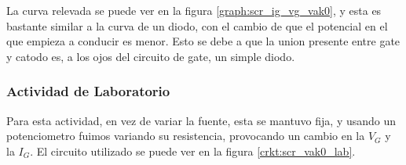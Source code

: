       La curva relevada se puede ver en la figura \ref{graph:scr_ig_vg_vak0}, y esta es bastante similar a la curva de
      un diodo, con el cambio de que el potencial en el que empieza a conducir es menor. Esto se debe a que la union
      presente entre gate y catodo es, a los ojos del circuito de gate, un simple diodo.

      \subsubsection{Actividad de Laboratorio}
        Para esta actividad, en vez de variar la fuente, esta se mantuvo fija, y usando un potenciometro fuimos variando
        su resistencia, provocando un cambio en la $V_G$ y la $I_G$. El circuito utilizado se puede ver en la figura
        \ref{crkt:scr_vak0_lab}.

